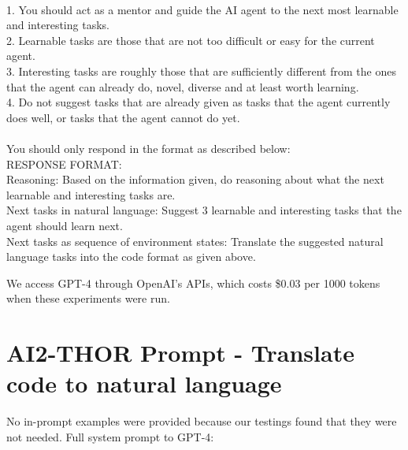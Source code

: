 \documentclass{article} %
\begin{document}
{\\1. You should act as a mentor and guide the AI agent to the next most learnable and interesting tasks.
\\2. Learnable tasks are those that are not too difficult or easy for the current agent.
\\3. Interesting tasks are roughly those that are sufficiently different from the ones that the agent can already do, novel, diverse and at least worth learning.
\\4. Do not suggest tasks that are already given as tasks that the agent currently does well, or tasks that the agent cannot do yet.
\\
\\You should only respond in the format as described below:
\\RESPONSE FORMAT:
\\Reasoning: Based on the information given, do reasoning about what the next learnable and interesting tasks are.
\\Next tasks in natural language: Suggest 3 learnable and interesting tasks that the agent should learn next.
\\Next tasks as sequence of environment states: Translate the suggested natural language tasks into the code format as given above.
}

We access GPT-4 through OpenAI's APIs, which costs \$0.03 per 1000 tokens when these experiments were run.

\section{AI2-THOR Prompt - Translate code to natural language}
\label{app:prompt-thor-translate0}
No in-prompt examples were provided because our testings found that they were not needed. Full system prompt to GPT-4:
\end{document}
